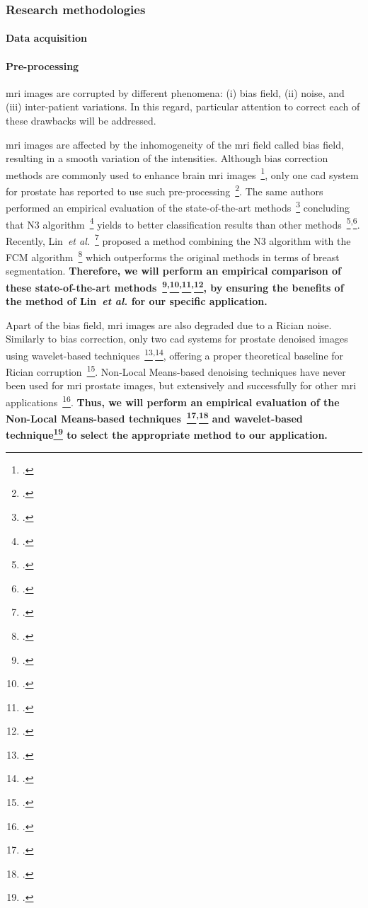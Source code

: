 \subsubsection{Research methodologies}
\label{sec:methodologies}

\paragraph{Data acquisition}

\paragraph{Pre-processing}

\Ac{mri} images are corrupted by different phenomena: (i) bias field, (ii) noise, and (iii) inter-patient variations.
In this regard, particular attention to correct each of these drawbacks will be addressed.

\Ac{mri} images are affected by the inhomogeneity of the \ac{mri} field called bias field, resulting in a smooth variation of the intensities.
Although bias correction methods are commonly used to enhance brain \ac{mri} images~\footcite{Vovk2007}, only one \ac{cad} system for prostate has reported to use such pre-processing~\footcite{Viswanath2009}.
The same authors performed an empirical evaluation of the state-of-the-art methods~\footcite{viswanath2011empirical} concluding that N3 algorithm~\footcite{Sled1998} yields to better classification results than other methods~\footcite{Styner2000}\textsuperscript{,}\footcite{Cohen2000}.
Recently, Lin~\emph{et al.}~\footcite{Lin2011} proposed a method combining the N3 algorithm with the FCM algorithm~\footcite{Ahmed2002} which outperforms the original methods in terms of breast segmentation.
\textbf{Therefore, we will perform an empirical comparison of these state-of-the-art methods~\footcite{Sled1998}\textsuperscript{,}\footcite{Styner2000}\textsuperscript{,}\footcite{Cohen2000}\textsuperscript{,}\footcite{Lin2011}, by ensuring the benefits of the method of Lin~\emph{et al.} for our specific application.}

Apart of the bias field, \Ac{mri} images are also degraded due to a Rician noise. Similarly to bias correction, only two \ac{cad} systems for prostate denoised images using wavelet-based techniques~\footcite{Mallat2008}\textsuperscript{,}\footcite{Pizurica2003}, offering a proper theoretical baseline for Rician corruption~\footcite{Nowak1999}.
Non-Local Means-based denoising techniques have never been used for \ac{mri} prostate images, but extensively and successfully for other \ac{mri} applications~\footcite{Manjon2008}.
\textbf{Thus, we will perform an empirical evaluation of the Non-Local Means-based techniques~\footcite{Manjon2012}\textsuperscript{,}\footcite{Coupe2011} and wavelet-based technique\footcite{Pizurica2003} to select the appropriate method to our application.}

